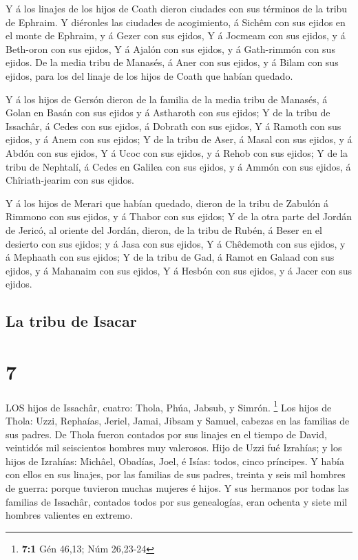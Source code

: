  Y á los linajes de los hijos de Coath dieron ciudades con
sus términos de la tribu de Ephraim.  Y diéronles las
ciudades de acogimiento, á Sichêm con sus ejidos en el monte de Ephraim,
y á Gezer con sus ejidos,  Y á Jocmeam con sus ejidos, y á
Beth-oron con sus ejidos,  Y á Ajalón con sus ejidos, y á
Gath-rimmón con sus ejidos.  De la media tribu de Manasés,
á Aner con sus ejidos, y á Bilam con sus ejidos, para los del linaje de
los hijos de Coath que habían quedado.

 Y á los hijos de Gersón dieron de la familia de la media
tribu de Manasés, á Golan en Basán con sus ejidos y á Astharoth con sus
ejidos;  Y de la tribu de Issachâr, á Cedes con sus ejidos,
á Dobrath con sus ejidos,  Y á Ramoth con sus ejidos, y á
Anem con sus ejidos;  Y de la tribu de Aser, á Masal con
sus ejidos, y á Abdón con sus ejidos,  Y á Ucoc con sus
ejidos, y á Rehob con sus ejidos;  Y de la tribu de
Nephtalí, á Cedes en Galilea con sus ejidos, y á Ammón con sus ejidos, á
Chîriath-jearim con sus ejidos.

 Y á los hijos de Merari que habían quedado, dieron de la
tribu de Zabulón á Rimmono con sus ejidos, y á Thabor con sus ejidos;
 Y de la otra parte del Jordán de Jericó, al oriente del
Jordán, dieron, de la tribu de Rubén, á Beser en el desierto con sus
ejidos; y á Jasa con sus ejidos,  Y á Chêdemoth con sus
ejidos, y á Mephaath con sus ejidos;  Y de la tribu de Gad,
á Ramot en Galaad con sus ejidos, y á Mahanaim con sus ejidos,
 Y á Hesbón con sus ejidos, y á Jacer con sus ejidos.

\hypertarget{la-tribu-de-isacar}{%
\subsection{La tribu de Isacar}\label{la-tribu-de-isacar}}

\hypertarget{section-6}{%
\section{7}\label{section-6}}

 LOS hijos de Issachâr, cuatro: Thola, Phúa, Jabsub, y
Simrón. \footnote{\textbf{7:1} Gén 46,13; Núm 26,23-24}  Los
hijos de Thola: Uzzi, Rephaías, Jeriel, Jamai, Jibsam y Samuel, cabezas
en las familias de sus padres. De Thola fueron contados por sus linajes
en el tiempo de David, veintidós mil seiscientos hombres muy valerosos.
 Hijo de Uzzi fué Izrahías; y los hijos de Izrahías:
Michâel, Obadías, Joel, é Isías: todos, cinco príncipes.  Y
había con ellos en sus linajes, por las familias de sus padres, treinta
y seis mil hombres de guerra: porque tuvieron muchas mujeres é hijos.
 Y sus hermanos por todas las familias de Issachâr, contados
todos por sus genealogías, eran ochenta y siete mil hombres valientes en
extremo.

